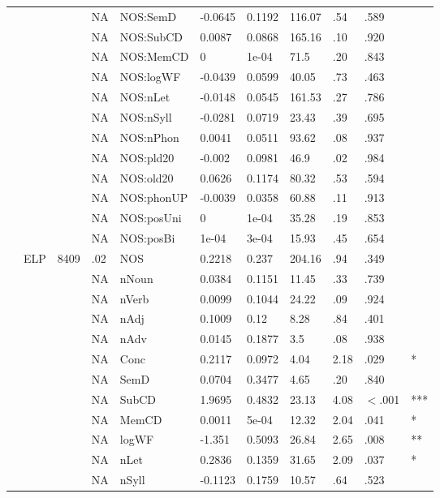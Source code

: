 \begin{table}[ht]
\begin{tabular}{lllllllllll}
   &  &  & NA & NOS:SemD & -0.0645 & 0.1192 & 116.07 & .54 & .589 &   \\ 
   &  &  & NA & NOS:SubCD & 0.0087 & 0.0868 & 165.16 & .10 & .920 &   \\ 
   &  &  & NA & NOS:MemCD & 0 & 1e-04 & 71.5 & .20 & .843 &   \\ 
   &  &  & NA & NOS:logWF & -0.0439 & 0.0599 & 40.05 & .73 & .463 &   \\ 
   &  &  & NA & NOS:nLet & -0.0148 & 0.0545 & 161.53 & .27 & .786 &   \\ 
   &  &  & NA & NOS:nSyll & -0.0281 & 0.0719 & 23.43 & .39 & .695 &   \\ 
   &  &  & NA & NOS:nPhon & 0.0041 & 0.0511 & 93.62 & .08 & .937 &   \\ 
   &  &  & NA & NOS:pld20 & -0.002 & 0.0981 & 46.9 & .02 & .984 &   \\ 
   &  &  & NA & NOS:old20 & 0.0626 & 0.1174 & 80.32 & .53 & .594 &   \\ 
   &  &  & NA & NOS:phonUP & -0.0039 & 0.0358 & 60.88 & .11 & .913 &   \\ 
   &  &  & NA & NOS:posUni & 0 & 1e-04 & 35.28 & .19 & .853 &   \\ 
   &  &  & NA & NOS:posBi & 1e-04 & 3e-04 & 15.93 & .45 & .654 &   \\ 
   & ELP & 8409 & .02 & NOS & 0.2218 & 0.237 & 204.16 & .94 & .349 &   \\ 
   &  &  & NA & nNoun & 0.0384 & 0.1151 & 11.45 & .33 & .739 &   \\ 
   &  &  & NA & nVerb & 0.0099 & 0.1044 & 24.22 & .09 & .924 &   \\ 
   &  &  & NA & nAdj & 0.1009 & 0.12 & 8.28 & .84 & .401 &   \\ 
   &  &  & NA & nAdv & 0.0145 & 0.1877 & 3.5 & .08 & .938 &   \\ 
   &  &  & NA & Conc & 0.2117 & 0.0972 & 4.04 & 2.18 & .029 & * \\ 
   &  &  & NA & SemD & 0.0704 & 0.3477 & 4.65 & .20 & .840 &   \\ 
   &  &  & NA & SubCD & 1.9695 & 0.4832 & 23.13 & 4.08 & $<$.001 & *** \\ 
   &  &  & NA & MemCD & 0.0011 & 5e-04 & 12.32 & 2.04 & .041 & * \\ 
   &  &  & NA & logWF & -1.351 & 0.5093 & 26.84 & 2.65 & .008 & ** \\ 
   &  &  & NA & nLet & 0.2836 & 0.1359 & 31.65 & 2.09 & .037 & * \\ 
   &  &  & NA & nSyll & -0.1123 & 0.1759 & 10.57 & .64 & .523 &   \\ 

\end{tabular}
\end{table}
